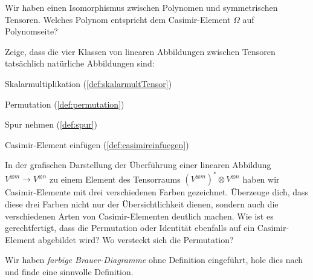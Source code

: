 \begin{sheet}

\begin{problem}
Wir haben einen Isomorphismus zwischen Polynomen und symmetrischen Tensoren. Welches Polynom entspricht dem Casimir-Element $\Omega$ auf Polynomseite?
\end{problem}

\begin{problem}[title={Die 4 Klassen von linearen Tensor-Abbildungen sind natürlich}]
	\label{aufg:natAbbKlass}
	Zeige, dass die vier Klassen von linearen Abbildungen zwischen Tensoren tatsächlich natürliche Abbildungen sind:
	\begin{subproblem}
		Skalarmultiplikation (\ref{def:skalarmultTensor})
	\end{subproblem}
	\begin{subproblem}
		Permutation (\ref{def:permutation})
	\end{subproblem}
	\begin{subproblem}
		Spur nehmen (\ref{def:spur})
	\end{subproblem}
	\begin{subproblem}
		Casimir-Element einfügen (\ref{def:casimireinfuegen})
	\end{subproblem}
\end{problem}

\begin{problem}[title={Bunte Casimir-Elemente}]
	In der grafischen Darstellung der Überführung einer linearen Abbildung $V^{\otimes m} \to V^{\otimes n}$ zu einem Element des Tensorraums $\left(V^{\otimes m}\right)^\ast \otimes V^{\otimes n}$ haben wir Casimir-Elemente mit drei verschiedenen Farben gezeichnet. Überzeuge dich, dass diese drei Farben nicht nur der Übersichtlichkeit dienen, sondern auch die verschiedenen Arten von Casimir-Elementen deutlich machen. Wie ist es gerechtfertigt, dass die Permutation oder Identität ebenfalls auf ein Casimir-Element abgebildet wird? Wo versteckt sich die Permutation?
	
	Wir haben \emph{farbige Brauer-Diagramme} ohne Definition eingeführt, hole dies nach und finde eine sinnvolle Definition.
\end{problem}


\end{sheet}

